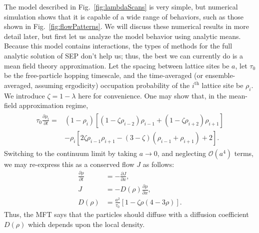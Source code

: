 \documentclass[
reprint,
 amsmath,amssymb,
 aps,
 prl,
]{revtex4-1}
\newcommand{\partDeriv}[2]{\frac{\partial #1}{\partial #2}}
\begin{document}
The model described in Fig.~\ref{fig:lambdaScans} is very simple, but numerical simulation shows that it is capable of a wide range of behaviors, such as those shown in Fig.~\ref{fig:flowPatterns}. We will discuss
these numerical results in more detail later, but first let us analyze the model behavior using analytic means.
Because this model contains interactions, the types of methods for the full analytic solution of SEP don't help us; thus, the best we can currently do is a mean field theory approximation.
Let the spacing between lattice sites be $a$, let $\tau_0$ be the free-particle hopping timescale, and the time-averaged (or ensemble-averaged, assuming ergodicity) occupation probability of the $i^{\mathrm{th}}$ lattice site be $\rho_i$.
We introduce $\zeta = 1 - \lambda $ here for convenience.
One may show that, in the mean-field approximation regime,
\begin{align}
\begin{split}
 \tau_0 \partDeriv{\rho_i}{t} = &\left( 1-\rho_i \right) \left[ \left(1-\zeta\rho_{i-2} \right) \rho_{i-1} + \left(1-\zeta\rho_{i+2} \right) \rho_{i+1} \right] \\
 &- \rho_i \left[ 2 \zeta \rho_{i-1} \rho_{i+1}  - (3-\zeta)\left(\rho_{i-1} + \rho_{i+1}\right) + 2 \right].
 \end{split}
 \end{align}
Switching to the continuum limit by taking $a\rightarrow 0$, and neglecting $\mathcal{O}(a^4)$ terms, we may re-express this as a conserved flow $J$ as follows:
\begin{align}
 \partDeriv{\rho}{t} &= - \partDeriv{J}{x}, \\
 J &= -  D(\rho) \partDeriv{\rho}{x}, \\
 D(\rho) &= \frac{a^2}{\tau_0} \left[1 - \zeta \rho\left(4-3\rho\right) \right]. \label{eq:diffCoeff} 
\end{align}
Thus, the MFT says that the particles should diffuse with a diffusion coefficient $D(\rho)$ which depends upon the local density.
\end{document}
